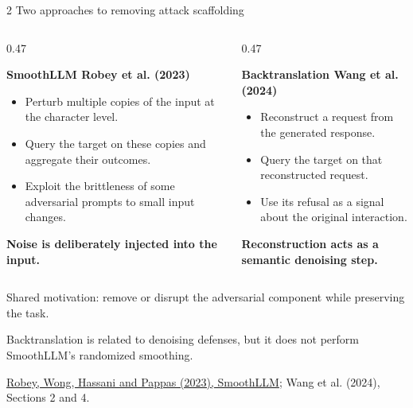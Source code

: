 \documentclass[aspectratio=169,10pt]{beamer}
\newcommand{\sources}[1]{{\fontsize{10.5}{13}\selectfont\color{Muted}#1\par}}
\newcommand{\subhead}[1]{{\color{Output}\bfseries #1\par}\par\vspace{0.18cm}}
\newcommand{\tightlist}{\setlength\itemsep{0.3cm}}
\begin{document}
\begin{frame}{2 \quad Two approaches to removing attack scaffolding}
 \begin{columns}[T,onlytextwidth]
  \begin{column}{0.47\textwidth}
   \subhead{SmoothLLM \quad Robey et al. (2023)}
   \begin{itemize}\tightlist
    \item Perturb multiple copies of the input at the character level.
    \item Query the target on these copies and aggregate their outcomes.
    \item Exploit the brittleness of some adversarial prompts to small input changes.
   \end{itemize}
   \par\vspace{0.5cm}\textbf{Noise is deliberately injected into the input.}
  \end{column}
  \begin{column}{0.47\textwidth}
   \subhead{Backtranslation \quad Wang et al. (2024)}
   \begin{itemize}\tightlist
    \item Reconstruct a request from the generated response.
    \item Query the target on that reconstructed request.
    \item Use its refusal as a signal about the original interaction.
   \end{itemize}
   \par\vspace{0.5cm}\textbf{Reconstruction acts as a semantic denoising step.}
  \end{column}
 \end{columns}
 \par\vspace{0.9cm}{\color{Ink}\rule{\textwidth}{0.6pt}}\par\par\vspace{0.35cm}
 Shared motivation: remove or disrupt the adversarial component while preserving the task.\par\par\vspace{0.25cm}
 Backtranslation is related to denoising defenses, but it does not perform SmoothLLM's randomized smoothing.
 \vfill
 \sources{\href{https://arxiv.org/abs/2310.03684}{Robey, Wong, Hassani and Pappas (2023), SmoothLLM}; Wang et al. (2024), Sections 2 and 4.}
\end{frame}
\end{document}
